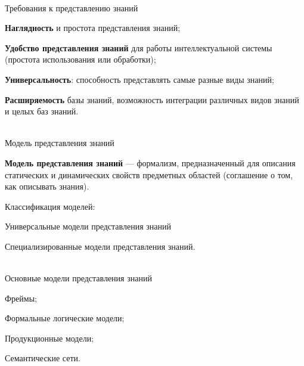 \begin{frame}{\\Требования к представлению знаний}
	\topline
	\justifying
	
	\begin{textitemize}
		\item \textbf{Наглядность} и простота представления знаний;
		\item \textbf{Удобство представления знаний} для работы интеллектуальной системы (простота использования или обработки);
		\item \textbf{Универсальность}: способность представлять самые разные виды знаний;
		\item \textbf{Расширяемость} базы знаний, возможность интеграции различных видов знаний и целых баз знаний.
	\end{textitemize}
	
\end{frame}

\begin{frame}{\\Модель представления знаний}
	\topline
	\justifying
	
	\textbf{Модель представления знаний} --- формализм, предназначенный для описания статических и динамических свойств предметных областей (соглашение о том, как описывать знания).
	
	\vspace{1em}
	
	Классификация моделей:
	\begin{textitemize}
		\item Универсальные модели представления знаний
		\item Специализированные модели представления знаний.
	\end{textitemize}
	
\end{frame}

\begin{frame}{\\Основные модели представления знаний}
	\topline
	\justifying
	
	\begin{textitemize}
		\item Фреймы;
		\item Формальные логические модели;
		\item Продукционные модели;
		\item Семантические сети.
	\end{textitemize}
	
\end{frame}

